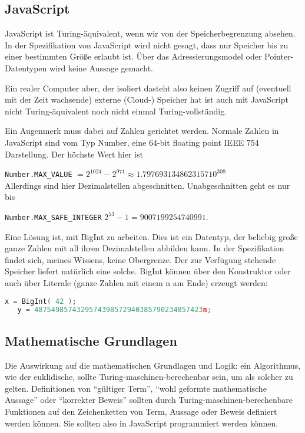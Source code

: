 \documentclass[a4paper]{amsart}
\theoremstyle{definition}
\begin{document}
\subsection{JavaScript}
JavaScript ist Turing-äquivalent, wenn wir von der Speicherbegrenzung absehen. In der Spezifikation von JavaScript wird nicht gesagt, dass nur Speicher bis zu einer bestimmten Größe erlaubt ist. Über das Adressierungsmodel oder Pointer-Datentypen wird keine Aussage gemacht.

Ein realer Computer aber, der isoliert dasteht also keinen Zugriff auf (eventuell mit der Zeit wachsende) externe (Cloud-) Speicher hat ist auch mit JavaScript nicht Turing-äquivalent noch nicht einmal Turing-vollständig.

Ein Augenmerk muss dabei auf Zahlen gerichtet werden. Normale Zahlen in JavaScript sind vom Typ Number, eine 64-bit floating point IEEE 754 Darstellung. Der höchste Wert hier ist

{\tt Number.MAX\_VALUE} $= 2^{1024} - 2^{971} \approx 1.7976931348623157 10^{308}$
\\Allerdings sind hier Dezimalstellen abgeschnitten. Unabgeschnitten geht es nur bis

{\tt Number.MAX\_SAFE\_INTEGER} $ 2^{53} - 1 = 9007199254740991$.

Eine Lösung ist, mit BigInt zu arbeiten. Dies ist ein Datentyp, der beliebig große ganze Zahlen mit all ihren Dezimalstellen abbilden kann. In der Spezifikation findet sich, meines Wissens, keine Obergrenze. Der zur Verfügung stehende Speicher liefert natürlich eine solche. BigInt können über den Konstruktor oder auch über Literale (ganze Zahlen mit einem n am Ende) erzeugt werden:

\begin{lstlisting}[language=c]
   x = BigInt( 42 );
   y = 4875498574329574398572940385790234857423n;
\end{lstlisting}

\subsection{Mathematische Grundlagen}
Die Auswirkung auf die mathematischen Grundlagen und Logik: ein Algorithmus, wie der euklidische, sollte Turing-maschinen-berechenbar sein, um als solcher zu gelten. Definitionen von "`gültiger Term"', "`wohl geformte mathematische Aussage"' oder "`korrekter Beweis"' sollten durch Turing-maschinen-berechenbare Funktionen auf den Zeichenketten von Term, Aussage oder Beweis definiert werden können. Sie sollten also in JavaScript programmiert werden können.
\end{document}
